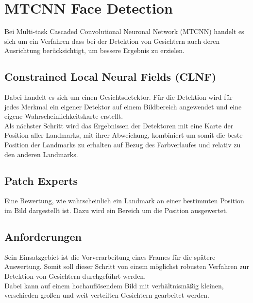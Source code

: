 \section{MTCNN Face Detection}
\label{MTCNN}
Bei Multi-task Cascaded Convolutional Neuronal Network (MTCNN) handelt es sich um ein Verfahren dass bei der Detektion von Gesichtern auch deren Ausrichtung berücksichtigt, um bessere Ergebnis zu erzielen.
\subsection{Constrained Local Neural Fields (CLNF)}
Dabei handelt es sich um einen Gesichtsdetektor. Für die Detektion wird für jedes Merkmal ein eigener Detektor auf einem Bildbereich angewendet und eine eigene Wahrscheinlichkeitskarte erstellt.\\
Als nächster Schritt wird das Ergebnissen der Detektoren mit eine Karte der Position aller Landmarks, mit ihrer Abweichung, kombiniert um somit die beste Position der Landmarks zu erhalten auf Bezug des Farbverlaufes und relativ zu den anderen Landmarks.
\cite{CLNF}
\subsection{Patch Experts}
Eine Bewertung, wie wahrscheinlich ein Landmark an einer bestimmten Position im Bild dargestellt ist. Dazu wird ein Bereich um die Position ausgewertet.
\cite{CLNF}
\subsection{Anforderungen}
Sein Einsatzgebiet ist die Vorverarbeitung eines Frames für die spätere Auswertung. Somit soll dieser Schritt von einem möglichst robusten Verfahren zur Detektion von Gesichtern durchgeführt werden.\\
Dabei kann auf einem hochauflösendem Bild mit verhältnismäßig kleinen, verschieden großen und weit verteilten Gesichtern gearbeitet werden.
